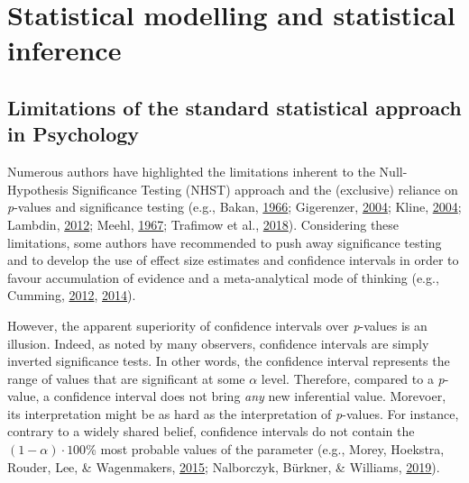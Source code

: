 \documentclass[a4paper,12pt,twoside,openright,oldfontcommands]{memoir}
\begin{document}
\section{Statistical modelling and statistical
inference}\label{statistical-modelling-and-statistical-inference}

\subsection{Limitations of the standard statistical approach in
Psychology}\label{limitations-of-the-standard-statistical-approach-in-psychology}

Numerous authors have highlighted the limitations inherent to the
Null-Hypothesis Significance Testing (NHST) approach and the (exclusive)
reliance on \emph{p}-values and significance testing (e.g., Bakan,
\protect\hyperlink{ref-bakan_test_1966}{1966}; Gigerenzer,
\protect\hyperlink{ref-Gigerenzer2004}{2004}; Kline,
\protect\hyperlink{ref-Kline2004}{2004}; Lambdin,
\protect\hyperlink{ref-Lambdin2012}{2012}; Meehl,
\protect\hyperlink{ref-meehl_theory-testing_1967}{1967}; Trafimow et
al., \protect\hyperlink{ref-trafimow_manipulating_2018}{2018}).
Considering these limitations, some authors have recommended to push
away significance testing and to develop the use of effect size
estimates and confidence intervals in order to favour accumulation of
evidence and a meta-analytical mode of thinking (e.g., Cumming,
\protect\hyperlink{ref-Cumming2012}{2012},
\protect\hyperlink{ref-cumming_new_2014}{2014}).

However, the apparent superiority of confidence intervals over
\emph{p}-values is an illusion. Indeed, as noted by many observers,
confidence intervals are simply inverted significance tests. In other
words, the confidence interval represents the range of values that are
significant at some \(\alpha\) level. Therefore, compared to a
\emph{p}-value, a confidence interval does not bring \emph{any} new
inferential value. Morevoer, its interpretation might be as hard as the
interpretation of \emph{p}-values. For instance, contrary to a widely
shared belief, confidence intervals do not contain the
\((1 - \alpha) \cdot 100\)\% most probable values of the parameter
(e.g., Morey, Hoekstra, Rouder, Lee, \& Wagenmakers,
\protect\hyperlink{ref-morey_fallacy_2015}{2015}; Nalborczyk, Bürkner,
\& Williams, \protect\hyperlink{ref-nalborczyk_pragmatism_2019}{2019}).
\end{document}
